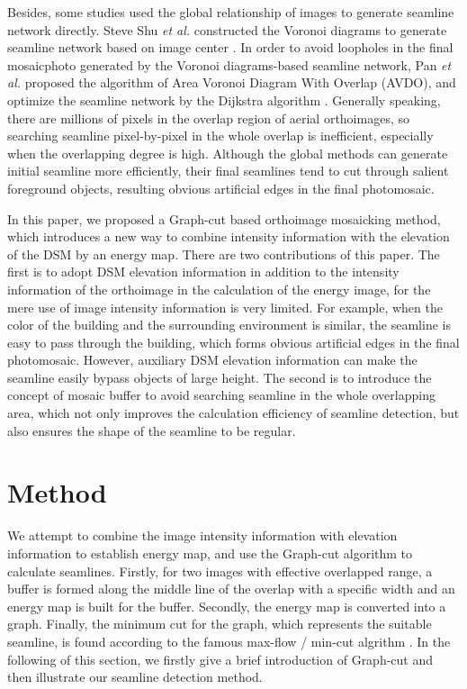 \documentclass[journal]{IEEEtran}
\begin{document}
Besides, some studies used the global relationship of images to generate seamline network directly. Steve Shu \textit{et al.} constructed the Voronoi diagrams to generate seamline network based on image center \cite{Hsu2002}. In order to avoid loopholes in the final mosaicphoto generated by the Voronoi diagrams-based seamline network, Pan \textit{et al.} proposed the algorithm of Area Voronoi Diagram With Overlap (AVDO), and optimize the seamline network by the Dijkstra algorithm \cite{Pan2009,Pan2014a}. Generally speaking, there are millions of pixels in the overlap region of aerial orthoimages, so searching seamline pixel-by-pixel in the whole overlap is inefficient, especially when the overlapping degree is high. Although the global methods can generate initial seamline more efficiently, their final seamlines tend to cut through salient foreground objects, resulting obvious artificial edges in the final photomosaic. 

In this paper, we proposed a Graph-cut based orthoimage mosaicking method, which introduces a new way to combine intensity information with the elevation of the DSM by an energy map. There are two contributions of this paper. The first is to adopt DSM elevation information in addition to the intensity information of the orthoimage in the calculation of the energy image, for the mere use of image intensity information is very limited. For example, when the color of the building and the surrounding environment is similar, the seamline is easy to pass through the building, which forms obvious artificial edges in the final photomosaic. However, auxiliary DSM elevation information can make the seamline easily bypass objects of large height. The second is to introduce the concept of mosaic buffer to avoid searching seamline in the whole overlapping area, which not only improves the calculation efficiency of seamline detection, but also ensures the shape of the seamline to be regular.

\section{Method}
We attempt to combine the image intensity information with elevation information to establish energy map, and use the Graph-cut algorithm to calculate seamlines. Firstly, for two images with effective overlapped range, a buffer is formed along the middle line of the overlap with a specific width and an energy map is built for the buffer. Secondly, the energy map is converted into a graph. Finally, the minimum cut for the graph, which represents the suitable seamline, is found according to the famous max-flow / min-cut algrithm \cite{Boykov2004}. In the following of this section, we firstly give a brief introduction of Graph-cut and then illustrate our seamline detection method.\par
\end{document}
